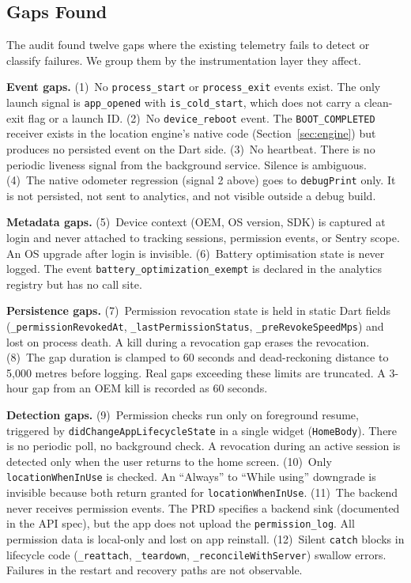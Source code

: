 \documentclass[10pt,journal,compsoc]{IEEEtran}
\begin{document}
\subsection{Gaps Found}
\label{sec:gaps}

The audit found twelve gaps where the existing telemetry fails to detect
or classify failures. We group them by the instrumentation layer they
affect.

\textbf{Event gaps.}
(1)~No \texttt{process\_start} or \texttt{process\_exit} events exist.
The only launch signal is \texttt{app\_opened} with
\texttt{is\_cold\_start}, which does not carry a clean-exit flag or a
launch ID.
(2)~No \texttt{device\_reboot} event. The \texttt{BOOT\_COMPLETED}
receiver exists in the location engine's native code
(Section~\ref{sec:engine}) but produces no persisted event on the Dart
side.
(3)~No heartbeat. There is no periodic liveness signal from the
background service. Silence is ambiguous.
(4)~The native odometer regression (signal 2 above) goes to
\texttt{debugPrint} only. It is not persisted, not sent to analytics,
and not visible outside a debug build.

\textbf{Metadata gaps.}
(5)~Device context (OEM, OS version, SDK) is captured at login and never
attached to tracking sessions, permission events, or Sentry scope. An OS
upgrade after login is invisible.
(6)~Battery optimisation state is never logged. The event
\texttt{battery\_optimization\_exempt} is declared in the analytics
registry but has no call site.

\textbf{Persistence gaps.}
(7)~Permission revocation state is held in static Dart fields
(\texttt{\_permissionRevokedAt}, \texttt{\_lastPermissionStatus},
\texttt{\_preRevokeSpeedMps}) and lost on process death. A kill during a
revocation gap erases the revocation.
(8)~The gap duration is clamped to 60 seconds and dead-reckoning
distance to 5,000 metres before logging. Real gaps exceeding these
limits are truncated. A 3-hour gap from an OEM kill is recorded as 60
seconds.

\textbf{Detection gaps.}
(9)~Permission checks run only on foreground resume, triggered by
\texttt{didChangeAppLifecycleState} in a single widget
(\texttt{HomeBody}). There is no periodic poll, no background check. A
revocation during an active session is detected only when the user
returns to the home screen.
(10)~Only \texttt{locationWhenInUse} is checked. An ``Always'' to
``While using'' downgrade is invisible because both return granted for
\texttt{locationWhenInUse}.
(11)~The backend never receives permission events. The PRD specifies a
backend sink (documented in the API spec), but the app does not
upload the \texttt{permission\_log}. All permission data is local-only
and lost on app reinstall.
(12)~Silent \texttt{catch} blocks in lifecycle code
(\texttt{\_reattach}, \texttt{\_teardown},
\texttt{\_reconcileWithServer}) swallow errors. Failures in the
restart and recovery paths are not observable.
\end{document}
